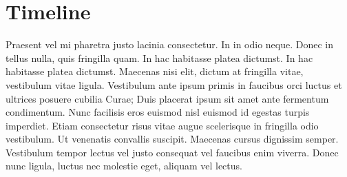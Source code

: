 \documentclass{article}
\begin{document}
\section{Timeline}
Praesent vel mi pharetra justo lacinia consectetur. In in odio neque.
Donec in tellus nulla, quis fringilla quam. In hac habitasse platea
dictumst. In hac habitasse platea dictumst. Maecenas nisi elit, dictum
at fringilla vitae, vestibulum vitae ligula. Vestibulum ante ipsum
primis in faucibus orci luctus et ultrices posuere cubilia Curae; Duis
placerat ipsum sit amet ante fermentum condimentum. Nunc facilisis
eros euismod nisl euismod id egestas turpis imperdiet. Etiam
consectetur risus vitae augue scelerisque in fringilla odio
vestibulum. Ut venenatis convallis suscipit. Maecenas cursus dignissim
semper. Vestibulum tempor lectus vel justo consequat vel faucibus enim
viverra. Donec nunc ligula, luctus nec molestie eget, aliquam vel
lectus.



\end{document}
